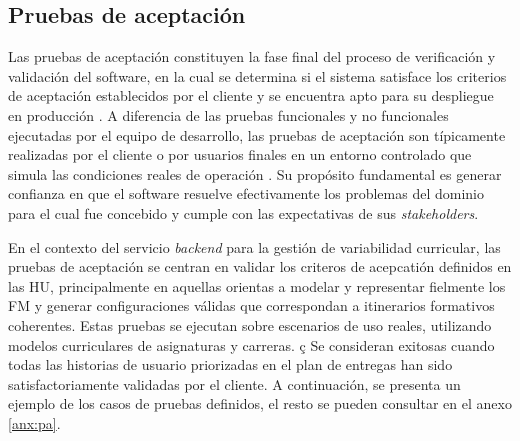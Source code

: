 \subsection{Pruebas de aceptación}

Las pruebas de aceptación constituyen la fase final del proceso de verificación y validación del software, 
en la cual se determina si el sistema satisface los criterios de aceptación establecidos por el cliente y se encuentra 
apto para su despliegue en producción \citep{pressman2014se}. A diferencia de las pruebas funcionales y no funcionales 
ejecutadas por el equipo de desarrollo, las pruebas de aceptación son típicamente realizadas por el cliente o por usuarios 
finales en un entorno controlado que simula las condiciones reales de operación \citep{crispin2008agile}. Su propósito 
fundamental es generar confianza en que el software resuelve efectivamente los problemas del dominio para el cual fue 
concebido y cumple con las expectativas de sus \textit{stakeholders}.

En el contexto del servicio \textit{backend} para la gestión de variabilidad curricular, las pruebas de aceptación se centran en 
validar los criteros de acepcatión definidos en las \ac{HU}, principalmente en aquellas orientas a modelar y representar
fielmente los \ac{FM} y generar configuraciones válidas que correspondan a itinerarios formativos coherentes.
Estas pruebas se ejecutan sobre escenarios de uso reales, utilizando modelos curriculares de asignaturas y carreras. ç
Se consideran exitosas cuando todas las historias de usuario priorizadas en el plan de entregas han sido 
satisfactoriamente validadas por el cliente. A continuación, se presenta un ejemplo de los casos de pruebas definidos, el 
resto se pueden consultar en el anexo \ref{anx:pa}.

